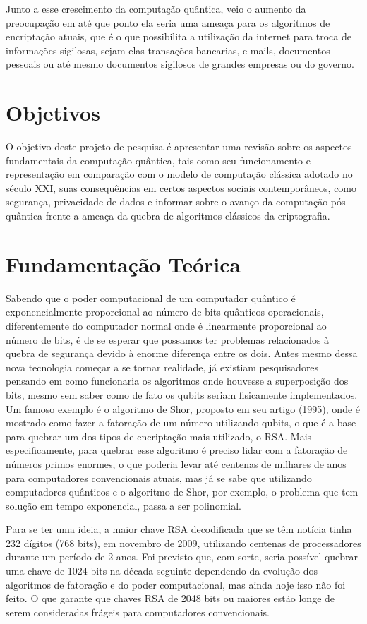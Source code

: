\documentclass[
	12pt,				%
	oneside,			%
	a4paper,			%
	english,			%
	french,				%
	spanish,			%
	brazil,				%
	]{abntex2}
\begin{document}
Junto a esse crescimento da computação quântica, veio o aumento da preocupação em até que ponto ela seria uma ameaça para os algoritmos de encriptação atuais, que é o que possibilita a utilização da internet para troca de informações sigilosas, sejam elas transações bancarias, e-mails, documentos pessoais ou até mesmo documentos sigilosos de grandes empresas ou do governo.

\chapter{Objetivos}

O objetivo deste projeto de pesquisa é apresentar uma revisão sobre os aspectos fundamentais da computação quântica, tais como seu funcionamento e representação em comparação com o modelo de computação clássica adotado no século XXI, suas consequências em certos aspectos sociais contemporâneos, como segurança, privacidade de dados e informar sobre o avanço da computação pós-quântica frente a ameaça da quebra de algoritmos clássicos da criptografia. 

\chapter{Fundamentação Teórica}

Sabendo que o poder computacional de um computador quântico é exponencialmente proporcional ao número de bits quânticos operacionais, diferentemente do computador normal onde é linearmente proporcional ao número de bits, é de se esperar que possamos ter problemas relacionados à quebra de segurança devido à enorme diferença entre os dois. Antes mesmo dessa nova tecnologia começar a se tornar realidade, já existiam pesquisadores pensando em como funcionaria os algoritmos onde houvesse a superposição dos bits, mesmo sem saber como de fato os qubits seriam fisicamente implementados. Um famoso exemplo é o algoritmo de Shor, proposto em seu artigo (1995), onde é mostrado como fazer a fatoração de um número utilizando qubits, o que é a base para quebrar um dos tipos de encriptação mais utilizado, o RSA. Mais especificamente, para quebrar esse algoritmo é preciso lidar com a fatoração de números primos enormes, o que poderia levar até centenas de milhares de anos para computadores convencionais atuais, mas já se sabe que utilizando computadores quânticos e o algoritmo de Shor, por exemplo, o problema que tem solução em tempo exponencial, passa a ser polinomial.

Para se ter uma ideia, a maior chave RSA decodificada que se têm notícia tinha 232 dígitos (768 bits), em novembro de 2009, utilizando centenas de processadores durante um período de 2 anos. Foi previsto que, com sorte, seria possível quebrar uma chave de 1024 bits na década seguinte dependendo da evolução dos algoritmos de fatoração e do poder computacional, mas ainda hoje isso não foi feito. O que garante que chaves RSA de 2048 bits ou maiores estão longe de serem consideradas frágeis para computadores convencionais.
\end{document}
